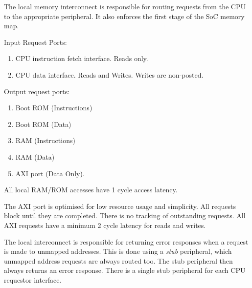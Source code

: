 
The local memory interconnect is responsible for routing requests from the
CPU to the appropriate peripheral.
It also enforces the first stage of the SoC memory map.


\noindent Input Request Ports:
\begin{enumerate}

\item CPU instruction fetch interface. Reads only.

\item CPU data interface. Reads and Writes. Writes are non-posted.

\end{enumerate}


\noindent Output request ports:
\begin{enumerate}

\item Boot ROM (Instructions)

\item Boot ROM (Data)

\item RAM (Instructions)

\item RAM (Data)

\item AXI port (Data Only).

\end{enumerate}

All local RAM/ROM accesses have 1 cycle access latency.

The AXI port is optimised for low resource usage and simplicity.
All requests block until they are completed. There is no
tracking of outstanding requests.
All AXI requests have a minimum 2 cycle latency for reads and writes.

The local interconnect is responsible for returning error responses
when a request is made to unmapped addresses.
This is done using a {\em stub} peripheral, which unmapped address
requests are always routed too.
The stub peripheral then always returns an error response.
There is a single stub peripheral for each CPU requestor interface.

